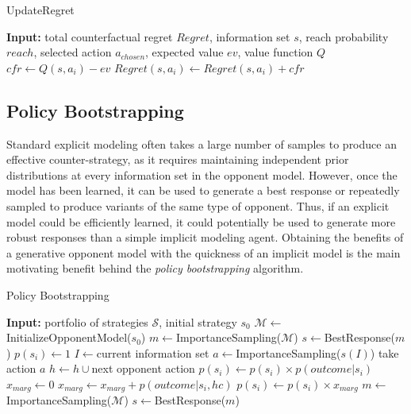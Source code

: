 \documentclass{aamas2013}
\begin{document}
    \begin{algorithm}
    \caption{UpdateRegret}
    \label{alg-tdcfr-updateregret}
    \begin{algorithmic}[1]
    \STATE \textbf{Input:} total counterfactual regret $Regret$, information set $s$, reach probability $reach$, selected action $a_{chosen}$, expected value $ev$, value function $Q$
        \STATE $cfr \leftarrow Q(s,a_{i}) - ev$
        \STATE $Regret(s,a_{i}) \leftarrow Regret(s,a_{i}) + cfr$
    \ENDFOR
    \end{algorithmic}
    \end{algorithm}

    \subsection{Policy Bootstrapping}
    Standard explicit modeling often takes a large number of samples to produce an effective counter-strategy, as it requires maintaining independent prior distributions at every information set in the opponent model. However, once the model has been learned, it can be used to generate a best response or repeatedly sampled to produce variants of the same type of opponent. Thus, if an explicit model could be efficiently learned, it could potentially be used to generate more robust responses than a simple implicit modeling agent. Obtaining the benefits of a generative opponent model with the quickness of an implicit model is the main motivating benefit behind the \textit{policy bootstrapping} algorithm.

    \begin{algorithm}
    \caption{Policy Bootstrapping}
    \label{alg-policybootstrapping}
    \begin{algorithmic}[1]
    \STATE \textbf{Input:} portfolio of strategies $\mathcal{S}$, initial strategy $s_0$
    \STATE $\mathcal{M} \leftarrow$InitializeOpponentModel($s_0$)
    \STATE $m \leftarrow$ImportanceSampling($\mathcal{M}$)
    \STATE $s \leftarrow$BestResponse($m$)
        \STATE $p(s_i) \leftarrow 1$
    \ENDFOR
    \LOOP
            \STATE $I \leftarrow$current information set
            \STATE $a \leftarrow$ImportanceSampling($s(I)$)
            \STATE take action $a$
            \STATE $h \leftarrow h \cup $next opponent action
        \ENDWHILE
              \STATE $p(s_i) \leftarrow p(s_i) \times p(outcome | s_i)$
            \ENDFOR
        \ELSE
              \STATE $x_{marg} \leftarrow 0$
                \STATE $x_{marg} \leftarrow x_{marg} + p(outcome | s_i, hc)$
              \ENDFOR
              \STATE $p(s_i) \leftarrow p(s_i) \times x_{marg}$
            \ENDFOR
        \ENDIF
        \STATE $m \leftarrow$ImportanceSampling($\mathcal{M}$)
        \STATE $s \leftarrow$BestResponse($m$)
    \ENDLOOP
    \end{algorithmic}
    \end{algorithm}
\end{document}
